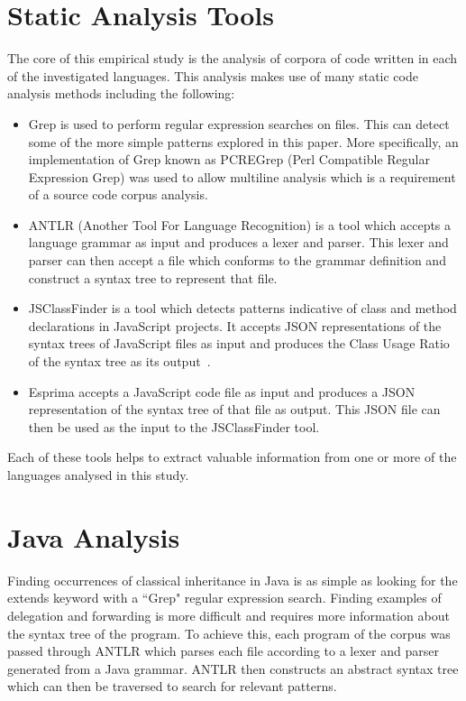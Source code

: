 \section{Static Analysis Tools}
The core of this empirical study is the analysis of corpora of code written in each of the investigated languages. This analysis makes use of many static code analysis methods including the following:
\begin{itemize}
	\item Grep is used to perform regular expression searches on files. This can detect some of the more simple patterns explored in this paper. More specifically, an implementation of Grep known as PCREGrep (Perl Compatible Regular Expression Grep) was used to allow multiline analysis which is a requirement of a source code corpus analysis.
	\item ANTLR (Another Tool For Language Recognition) is a tool which accepts a language grammar as input and produces a lexer and parser. This lexer and parser can then accept a file which conforms to the grammar definition and construct a syntax tree to represent that file.
	\item JSClassFinder is a tool which detects patterns indicative of class and method declarations in JavaScript projects. It accepts JSON representations of the syntax trees of JavaScript files as input and produces the Class Usage Ratio of the syntax tree as its output~\cite{JSClassFinder}.
	\item Esprima accepts a JavaScript code file as input and produces a JSON representation of the syntax tree of that file as output. This JSON file can then be used as the input to the JSClassFinder tool.
\end{itemize}
Each of these tools helps to extract valuable information from one or more of the languages analysed in this study.

\section{Java Analysis}
Finding occurrences of classical inheritance in Java is as simple as looking for the extends keyword with a ``Grep" regular expression search. Finding examples of delegation and forwarding is more difficult and requires more information about the syntax tree of the program. To achieve this, each program of the corpus was passed through ANTLR which parses each file according to a lexer and parser generated from a Java grammar. ANTLR then constructs an abstract syntax tree which can then be traversed to search for relevant patterns.
\newline

